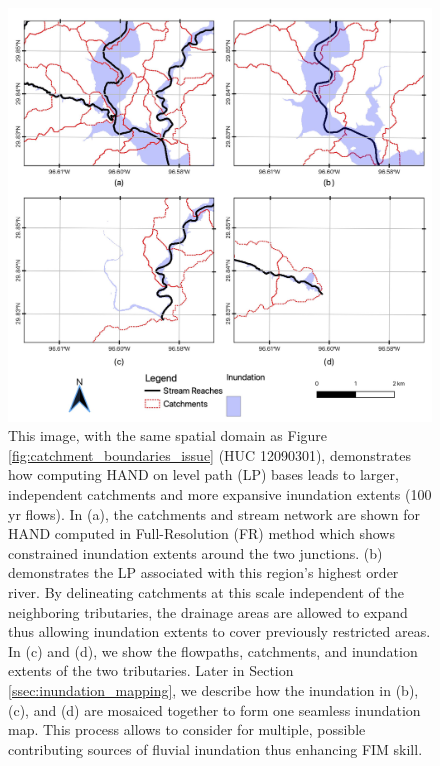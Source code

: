 \begin{figure}[H]
\centering
\includegraphics[scale=0.70]{figures/gms_methods_2.jpg}
\caption{This image, with the same spatial domain as Figure \ref{fig:catchment_boundaries_issue} (HUC 12090301), demonstrates how computing HAND on level path (LP) bases leads to larger, independent catchments and more expansive inundation extents (100 yr flows).
In (a), the catchments and stream network are shown for HAND computed in Full-Resolution (FR) method which shows constrained inundation extents around the two junctions.
(b) demonstrates the LP associated with this region's highest order river.
By delineating catchments at this scale independent of the neighboring tributaries, the drainage areas are allowed to expand thus allowing inundation extents to cover previously restricted areas.
In (c) and (d), we show the flowpaths, catchments, and inundation extents of the two tributaries.
Later in Section \ref{ssec:inundation_mapping}, we describe how the inundation in (b), (c), and (d) are mosaiced together to form one seamless inundation map.
This process allows to consider for multiple, possible contributing sources of fluvial inundation thus enhancing FIM skill.
}
\label{fig:gms_methods_2}
\end{figure}
%
